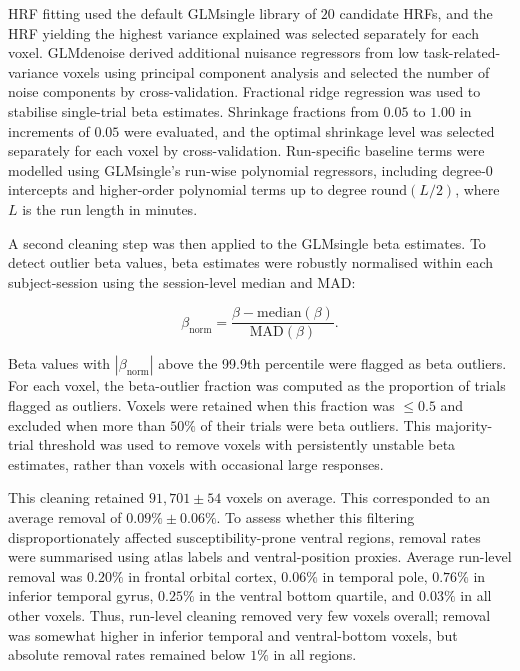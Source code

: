 \documentclass[utf8]{frontiers_suppmat}
\begin{document}
HRF fitting used the default GLMsingle library of $20$ candidate HRFs, and the HRF yielding the highest variance explained was selected separately for each voxel. GLMdenoise derived additional nuisance regressors from low task-related-variance voxels using principal component analysis and selected the number of noise components by cross-validation. Fractional ridge regression was used to stabilise single-trial beta estimates. Shrinkage fractions from $0.05$ to $1.00$ in increments of $0.05$ were evaluated, and the optimal shrinkage level was selected separately for each voxel by cross-validation. Run-specific baseline terms were modelled using GLMsingle's run-wise polynomial regressors, including degree-0 intercepts and higher-order polynomial terms up to degree $\mathrm{round}(L/2) $, where $ L$ is the run length in minutes.

A second cleaning step was then applied to the GLMsingle beta estimates. To detect outlier beta values, beta estimates were robustly normalised within each subject-session using the session-level median and MAD:

\[
\beta_{\mathrm{norm}} = \frac{\beta - \mathrm{median}(\beta)}{\mathrm{MAD}(\beta)} .
\]

Beta values with $|\beta_{\mathrm{norm}}|$ above the 99.9th percentile were flagged as beta outliers. For each voxel, the beta-outlier fraction was computed as the proportion of trials flagged as outliers. Voxels were retained when this fraction was $\leq 0.5$ and excluded when more than $50\%$ of their trials were beta outliers. This majority-trial threshold was used to remove voxels with persistently unstable beta estimates, rather than voxels with occasional large responses.

This cleaning retained $91{,}701 \pm 54$ voxels on average. This corresponded to an average removal of $0.09\% \pm 0.06\%$. To assess whether this filtering disproportionately affected susceptibility-prone ventral regions, removal rates were summarised using atlas labels and ventral-position proxies. Average run-level removal was $0.20\%$ in frontal orbital cortex, $0.06\%$ in temporal pole, $0.76\%$ in inferior temporal gyrus, $0.25\%$ in the ventral bottom quartile, and $0.03\%$ in all other voxels. Thus, run-level cleaning removed very few voxels overall; removal was somewhat higher in inferior temporal and ventral-bottom voxels, but absolute removal rates remained below $1\%$ in all regions.
\end{document}

